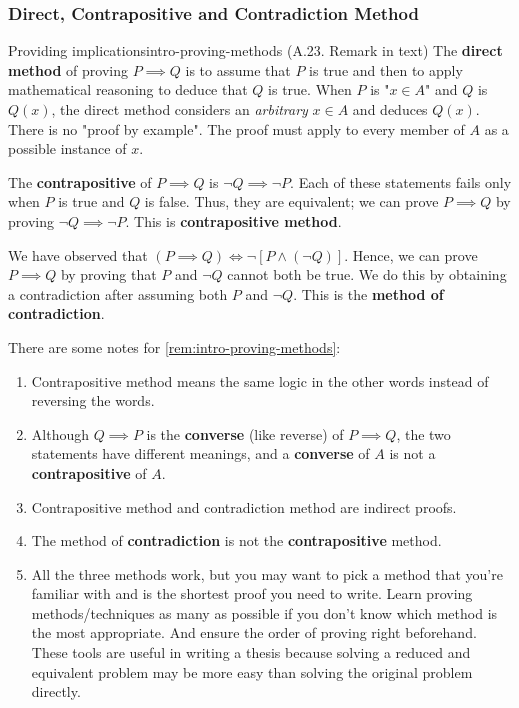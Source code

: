\documentclass[../src/handouts/main.tex]{subfiles}
\begin{document}
\subsubsection{Direct, Contrapositive and Contradiction Method}

\begin{remark}{Providing implications}{intro-proving-methods}
  (A.23. Remark in text)
  The \textbf{direct method} of proving $P \implies Q$ is to assume that $P$ is true and then to apply mathematical reasoning to deduce that $Q$ is true.
  When $P$ is "$x \in A$" and $Q$ is $Q(x)$, the direct method considers an \textit{arbitrary} $x \in A$ and deduces $Q(x)$.
  There is no "proof by example".
  The proof must apply to every member of $A$ as a possible instance of $x$.

  The \textbf{contrapositive} of $P \implies Q$ is $\neg Q \implies \neg P$. Each of these statements fails only when $P$ is true and $Q$ is false. Thus, they are equivalent; we can prove $P \implies Q$ by proving $\neg Q \implies \neg P$. This is \textbf{contrapositive method}.

  We have observed that $(P \implies Q) \iff \neg \left[ P \land (\neg Q) \right]$.
  Hence, we can prove $P \implies Q$ by proving that $P$ and $\neg Q$ cannot both be true.
  We do this by obtaining a contradiction after assuming both $P$ and $\neg Q$.
  This is the \textbf{method of contradiction}.
\end{remark}

There are some notes for \cref{rem:intro-proving-methods}:
\begin{enumerate}
  \item Contrapositive method means the same logic in the other words instead of reversing the words.
  \item Although $Q \implies P$ is the \textbf{converse} (like reverse) of $P \implies Q$, the two statements have different meanings, and a \textbf{converse} of $A$ is not a \textbf{contrapositive} of $A$.
  \item Contrapositive method and contradiction method are indirect proofs.
  \item The method of \textbf{contradiction} is not the \textbf{contrapositive} method.
  \item All the three methods work, but you may want to pick a method that you're familiar with and is the shortest proof you need to write. Learn proving methods/techniques as many as possible if you don't know which method is the most appropriate. And ensure the order of proving right beforehand. These tools are useful in writing a thesis because solving a reduced and equivalent problem may be more easy than solving the original problem directly.
\end{enumerate}
\end{document}
